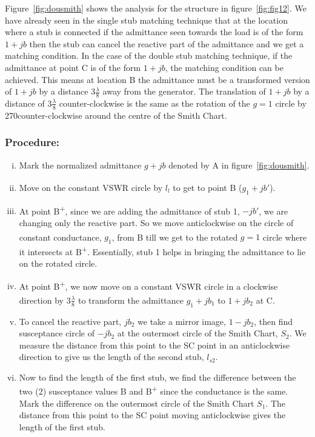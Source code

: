 Figure~\ref{fig:dousmith} shows the analysis for the structure in figure~\ref{fig:fig12}. We have already seen in the single stub matching technique that at the location where a stub is connected if the admittance seen towards the load is of the form $1 +jb$ then the stub can cancel the reactive part of the admittance and we get a matching condition. In the case of the double stub matching technique, if the admittance at point C is of the form $1 + jb$, the matching condition can be achieved. This means at location B the admittance must be a transformed version of $1 + jb$ by a distance $3\frac{\lambda}{8}$ away from the generator. The translation of $1 + jb$ by a distance of $3\frac{\lambda}{8}$ counter-clockwise is the same as the rotation of the $g = 1$ circle by 270\textdegree counter-clockwise around the centre of the Smith Chart.

\subsubsection*{Procedure:}
\begin{enumerate}[(i)]
\item Mark the normalized admittance $g + jb$ denoted by A in figure~\ref{fig:dousmith}.
\item Move on the constant VSWR circle by $l_l$ to get to point B\textsuperscript{\textemdash} ($g_1 + jb'$).
\item At point B\textsuperscript{+}, since we are adding the admittance of stub 1, $-jb'$, we are changing only the reactive part. So we move anticlockwise on the circle of constant conductance, $g_1$, from B\textsuperscript{\textemdash} till we get to the rotated $g = 1$ circle where it intersects at B\textsuperscript{+}. Essentially, stub 1 helps in bringing the admittance to lie on the rotated circle.
\item At point B\textsuperscript{+}, we now move on a constant VSWR circle in a clockwise direction by $ 3\frac{\lambda}{8}$ to transform the admittance $g_1 + jb_1$ to $1 + jb_2$ at C\textsuperscript{\textemdash}.
\item To cancel the reactive part, $jb_2$ we take a mirror image, $1-jb_2$, then find susceptance circle of $-jb_2$ at the outermost circle of the Smith Chart, $S_2$. We measure the distance from this point to the SC point in an anticlockwise direction to give us the length of the second stub, $l_{s2}$.
\item Now to find the length of the first stub, we find the difference between the two (2) susceptance values B\textsuperscript{\textemdash} and B\textsuperscript{+} since the conductance is the same. Mark the difference on the outermost circle of the Smith Chart $S_1$. The distance from this point to the SC point moving anticlockwise gives the length of the first stub.
\end{enumerate}

